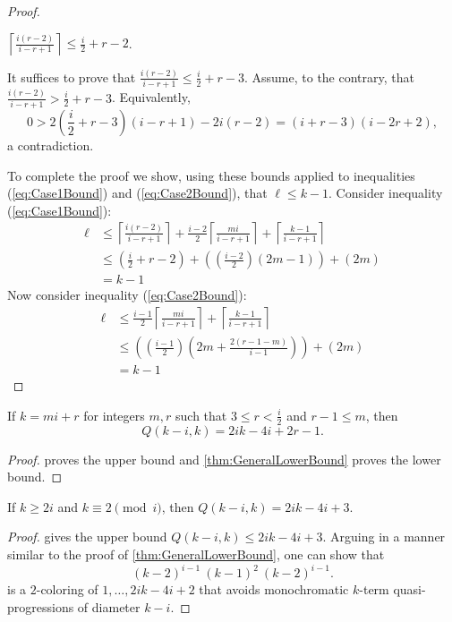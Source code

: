 \begin{proof}
\begin{claim}[Bound 3]$\left\lceil \frac{i(r-2)}{i - r + 1} \right\rceil \leq \frac{i}{2} + r - 2$.

It suffices to prove that  $\frac{i(r-2)}{i - r + 1} \leq \frac{i}{2} + r - 3$. Assume, to the contrary, that $ \frac{i(r-2)}{i - r + 1} > \frac{i}{2} + r - 3$. Equivalently, \[ 0  >  2\left(\frac{i}{2}+ r- 3\right)(i-r+1) - 2i (r-2) = (i+r-3)(i-2r+2),\] a contradiction.
\end{claim}

To complete the proof we show, using these bounds applied to inequalities (\ref{eq:Case1Bound}) and (\ref{eq:Case2Bound}), that $\ell \leq k-1$. Consider inequality (\ref{eq:Case1Bound}):
	\begin{align*}
		\ell	&\leq \left\lceil \frac{i(r-2)}{i - r + 1} \right\rceil + \frac{i-2}{2} \left\lceil \frac{mi}{i - r + 1} \right\rceil + \left\lceil \frac{k-1}{i - r + 1} \right\rceil\\
   			&\leq \left(\frac{i}{2} + r - 2\right) + \left( \left( \frac{i-2}{2}\right) \left( 2m-1 \right)\right) + \left( 2m \right)\\
			&= k-1
   \end{align*}
Now consider inequality (\ref{eq:Case2Bound}):
	\begin{align*}
		\ell	&\leq \frac{i-1}{2} \left\lceil \frac{mi}{i - r + 1} \right\rceil + \left\lceil \frac{k-1}{i - r + 1} \right\rceil\\
			&\leq \left( \left( \frac{i-1}{2}\right) \left( 2m + \frac{2(r-1-m)}{i-1} \right)\right) + \left( 2m \right)\\
			&= k-1
   \end{align*}
\end{proof}

\begin{theorem} \label{thm:SharpGeneralBound} If $k=mi+r$ for integers $m,r$ such that $3 \leq r < \frac{i}{2}$ and $r-1 \leq m$, then \[Q(k-i,k) = 2ik-4i+2r-1.\]
\end{theorem}
\begin{proof}   proves the upper bound and \autoref{thm:GeneralLowerBound} proves the lower bound.
\end{proof}

\begin{theorem} If $k \geq 2i$ and $k \equiv 2 \pmod{i}$, then $Q(k-i,k) = 2ik-4i+3$.
\end{theorem}
\begin{proof}  gives the upper bound $Q(k-i,k) \leq 2ik-4i+3$. Arguing in a manner similar to the proof of \autoref{thm:GeneralLowerBound}, one can show that \[ (k-2)^{i-1}\ (k-1)^{2}\ (k-2)^{i-1}.\] is a $2$-coloring of $1,\dotsc, 2ik-4i+2$ that avoids monochromatic $k$-term quasi-progressions of diameter $k-i$.
\end{proof} 

